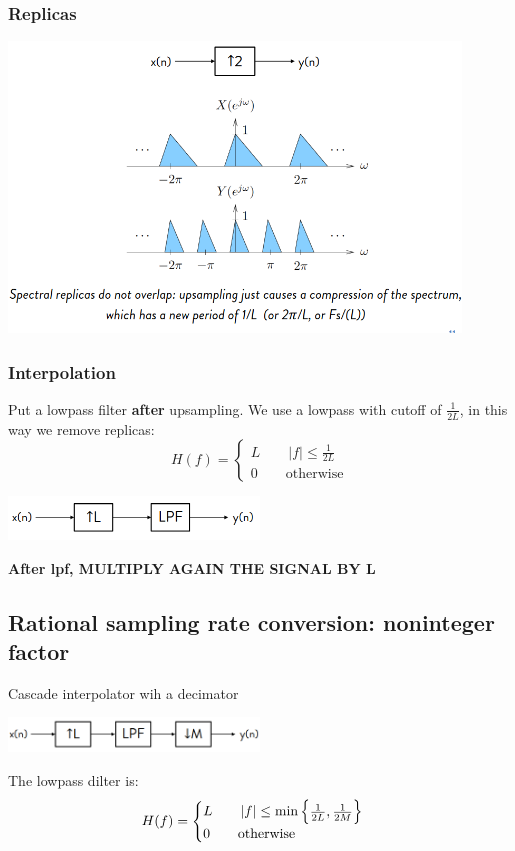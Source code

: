     \subsubsection{Replicas}
    \begin{center}
        \includegraphics[width=0.9\textwidth]{images/upsampling_replica.png}
    \end{center}

    \subsubsection{Interpolation}
    Put a lowpass filter \textbf{after} upsampling. We use a lowpass with cutoff of $\frac{1}{2L}$, in this way we remove replicas:
    $$
    H(f)=\begin{cases}
        L\qquad|f|\leq\frac{1}{2L}\\
        0\qquad\text{otherwise}
    \end{cases}
    $$
    \begin{center}
        \includegraphics[width=0.5\textwidth]{images/upsampling_Interpolation.png}
    \end{center}
    \textbf{After lpf, MULTIPLY AGAIN THE SIGNAL BY L}

\subsection{Rational sampling rate conversion: noninteger factor}
    Cascade interpolator wih a decimator
    \begin{center}
        \includegraphics[width=0.5\textwidth]{images/rationalsampling.png}
    \end{center}
    The lowpass dilter is:
    $$
    H(f)=\begin{cases}
        L\qquad|f|\leq\min\begin{Bmatrix} {\frac{1}{2L},\frac{1}{2M}} \end{Bmatrix}\\
        0\qquad\text{otherwise}
    \end{cases}
    $$
